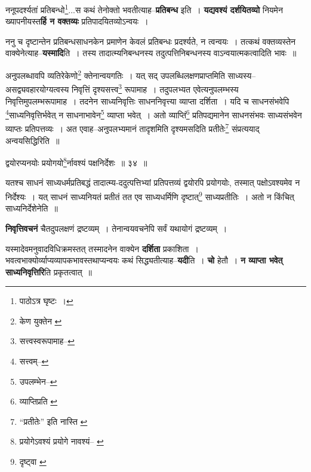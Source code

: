 \documentclass[article,12pt,a4paper]{memoir}
\begin{document}
	  \pstart ननूपदर्श्यतां प्रतिबन्धो\footnote{पाठोऽत्र घृष्टः ।}\-...स कथं तेनोक्तो भवतीत्याह--\textbf{प्रतिबन्ध} इति । \textbf{यद्यवश्यं दर्शयितव्यो} नियमेन ख्यापनीयस्त\textbf{र्हि न वक्तव्यः} प्रतिपादयितव्योऽन्वयः ।
	\pend
      

	  \pstart ननु च दृष्टान्तेन प्रतिबन्धसाधनकेन प्रमाणेन केवलं प्रतिबन्धः प्रदर्श्यते, न त्वन्वयः । तत्कथं वक्तव्यस्तेन वाक्येनेत्याह--\textbf{यस्मादि}ति । तस्य तादात्म्यनिबन्धनस्य तदुत्पत्तिनिबन्धनस्य वाऽन्वयात्मकत्वादिति भावः ॥
	\pend
	  \bigskip
	  \begingroup
	

	  \pstart अनुपलब्धावपि व्यतिरेकेणो\footnote{केण युक्तेन \cite{dp-msB}} क्तेनान्वयगतिः । यत् सद् उपलब्धिलक्षणप्राप्तमिति साध्यस्य--असद्व्यवहारयोग्यत्वस्य निवृत्तिं दृश्यसत्त्व\footnote{सत्त्वस्वरूपामाह--\cite{dp-msC}} रूपामाह । तदुपलभ्यत एवेत्यनुपलम्भस्य निवृत्तिमुपलम्भरूपामाह । तदनेन साध्यनिवृत्तिः साधननिवृत्त्या व्याप्ता दर्शिता । यदि च साधनसंभवेपि \footnote{सत्त्वम्--\cite{dp-msD-n}}\-साध्यनिवृत्तिर्भवेत् न साधनाभावेन\footnote{उपलम्भेन--\cite{dp-msD-n}} व्याप्ता भवेत् । अतो व्याप्तिं\footnote{व्याप्तिप्रति \cite{dp-msA}} प्रतिपद्यमानेन साधनसंभवः साध्यसंभवेन व्याप्तः प्रतिपत्तव्यः । अत एवाह--अनुपलभ्यमानं तादृशमिति दृश्यमसदिति प्रतीतेः\footnote{“प्रतीतेः” इति नास्ति \cite{dp-msA}} संप्रत्ययाद् अन्वयसिद्धिरिति ॥
	\pend
       
	  \bigskip
	  \begingroup
	

	  \pstart द्वयोरप्यनयोः प्रयोगयो\footnote{प्रयोगेऽवश्यं \cite{dp-msB} \cite{dp-edP} \cite{dp-edH} प्रयोगे नावश्यं--\cite{dp-edE} \cite{dp-edN}}\-र्नावश्यं पक्षनिर्देशः ॥ ३४ ॥
	\pend
      
	  \endgroup
	 

	  \pstart यतश्च साधनं साध्यधर्मप्रतिबद्धं तादात्म्य-ददुत्पत्तिभ्यां प्रतिपत्तव्यं द्वयोरपि प्रयोगयोः, तस्मात् पक्षोऽवश्यमेव न निर्देश्यः । यत् साधनं साध्यनियतं प्रतीतं तत एव साध्यधर्मिणि दृष्टात्\footnote{दृष्ट्वा \cite{dp-msA} \cite{dp-edP} \cite{dp-edH}} साध्यप्रतीतिः । अतो न किंचित् साध्यनिर्देशेनेति ॥
	\pend
      
	  \endgroup
	

	  \pstart \textbf{निवृत्तिवचनं} चैतदुपलक्षणं द्रष्टव्यम् । तेनान्वयवचनेपि सर्वं यथायोगं द्रष्टव्यम् ।
	\pend
      

	  \pstart यस्मादेवमनुवादविधिक्रमस्तत् तस्मादनेन वाक्येन \textbf{दर्शिता} प्रकाशिता । भवत्वभाक्योर्व्याप्यव्यापकभावस्तथाप्यन्वयः कथं सिद्ध्यतीत्याह--\textbf{यदी}ति । \textbf{चो} हेतौ । \textbf{न व्याप्ता भवेत् साध्यनिवृत्तिरि}ति प्रकृतत्वात् ॥
	\pend
      
\end{document}

